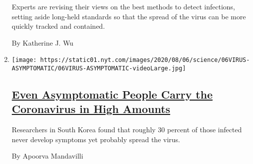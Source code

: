 \begin{enumerate}
  Experts are revising their views on the best methods to detect
  infections, setting aside long-held standards so that the spread of
  the virus can be more quickly tracked and contained.

  By Katherine J. Wu
\item
  \texttt{[image: https://static01.nyt.com/images/2020/08/06/science/06VIRUS-ASYMPTOMATIC/06VIRUS-ASYMPTOMATIC-videoLarge.jpg]}

  \hypertarget{even-asymptomatic-people-carry-the-coronavirus-in-high-amounts}{%
  \subsection{\texorpdfstring{\href{/2020/08/06/health/coronavirus-asymptomatic-transmission.html}{Even
  Asymptomatic People Carry the Coronavirus in High
  Amounts}}{Even Asymptomatic People Carry the Coronavirus in High Amounts}}\label{even-asymptomatic-people-carry-the-coronavirus-in-high-amounts}}

  Researchers in South Korea found that roughly 30 percent of those
  infected never develop symptoms yet probably spread the virus.

  By Apoorva Mandavilli
\end{enumerate}

